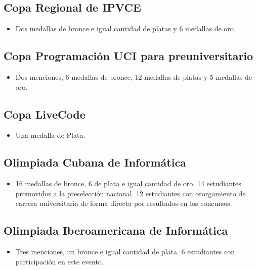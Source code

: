 
\subsection{Copa Regional de IPVCE}

\begin{itemize}
    \item Dos medallas de bronce e igual cantidad de platas y 6 medallas de oro.
\end{itemize}

\subsection{Copa Programación UCI para preuniversitario}

\begin{itemize}
	\item Dos menciones, 6 medallas de bronce, 12 medallas de platas y 5 medallas de oro.
\end{itemize}

\subsection{Copa LiveCode}

\begin{itemize}
	\item Una medalla de Plata.
\end{itemize}

\subsection{Olimpiada Cubana de Informática}

\begin{itemize}
	\item 16 medallas de bronce, 6 de plata e igual cantidad de oro. 14 estudiantes promovidos a la preselección nacional. 12 estudiantes con otorgamiento de carrera universitaria de forma directa
	por resultados en los concursos. 
\end{itemize}

\subsection{Olimpiada Iberoamericana de Informática}

\begin{itemize}
	\item Tres menciones, un bronce e igual cantidad de plata. 6 estudiantes con participación en este evento.
\end{itemize}

